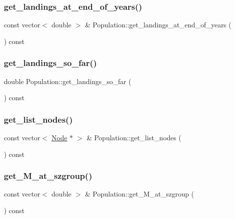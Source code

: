 \subsubsection{\texorpdfstring{get\_landings\_at\_end\_of\_years()}{get\_landings\_at\_end\_of\_years()}}
{\footnotesize\ttfamily const vector$<$ double $>$ \& Population\+::get\+\_\+landings\+\_\+at\+\_\+end\+\_\+of\+\_\+years (\begin{DoxyParamCaption}{ }\end{DoxyParamCaption}) const}

\mbox{\label{class_population_afa14273ce155674e6842390336d45056}} 
\subsubsection{\texorpdfstring{get\_landings\_so\_far()}{get\_landings\_so\_far()}}
{\footnotesize\ttfamily double Population\+::get\+\_\+landings\+\_\+so\+\_\+far (\begin{DoxyParamCaption}{ }\end{DoxyParamCaption}) const}

\mbox{\label{class_population_aa0a1faaf348f64c4f279c4eb8ebc6438}} 
\subsubsection{\texorpdfstring{get\_list\_nodes()}{get\_list\_nodes()}}
{\footnotesize\ttfamily const vector$<$ \mbox{\hyperlink{class_node}{Node}} $\ast$ $>$ \& Population\+::get\+\_\+list\+\_\+nodes (\begin{DoxyParamCaption}{ }\end{DoxyParamCaption}) const}

\mbox{\label{class_population_a5d99b48d185a8c0476853561b5b8743c}} 
\subsubsection{\texorpdfstring{get\_M\_at\_szgroup()}{get\_M\_at\_szgroup()}}
{\footnotesize\ttfamily const vector$<$ double $>$ \& Population\+::get\+\_\+\+M\+\_\+at\+\_\+szgroup (\begin{DoxyParamCaption}{ }\end{DoxyParamCaption}) const}

